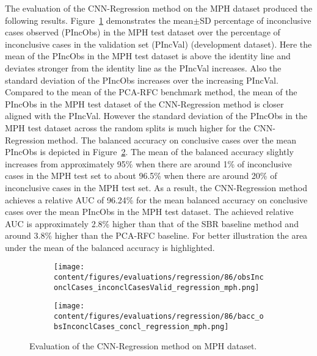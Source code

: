 

The evaluation of the CNN-Regression method on the MPH dataset produced the following results.
Figure~\ref{fig:obsInconclCases_inconclCasesValid_regression_mph} demonstrates
the mean$\pm$SD percentage of inconclusive cases observed (PIncObs) in the MPH test dataset 
over the percentage of inconclusive cases in the validation set (PIncVal) (development dataset).
Here the mean of the PIncObs in the MPH test dataset is above the identity line 
and deviates stronger from the identity line as the PIncVal increases.
Also the standard deviation of the PIncObs increases over the increasing PIncVal.
Compared to the mean of the PCA-RFC benchmark method, 
the mean of the PIncObs in the MPH test dataset of the CNN-Regression method is closer aligned with the PIncVal.
However the standard deviation of the PIncObs in the MPH test dataset across the random splits 
is much higher for the CNN-Regression method.
The balanced accuracy on conclusive cases over the mean PIncObs 
is depicted in Figure~\ref{fig:bacc_obsInconclCases_concl_regression_mph}.
The mean of the balanced accuracy slightly increases from approximately 95\% 
when there are around 1\% of inconclusive cases in the MPH test set to about 96.5\% 
when there are around 20\% of inconclusive cases in the MPH test set.
As a result, the CNN-Regression method achieves a relative AUC of 96.24\% for the mean balanced accuracy on conclusive cases 
over the mean PIncObs in the MPH test dataset.
The achieved relative AUC is approximately 2.8\% higher than that of the SBR baseline method 
and around 3.8\% higher than the PCA-RFC baseline.
For better illustration the area under the mean of the balanced accuracy is highlighted.


\begin{figure}[ht]
  \begin{subfigure}{0.9\textwidth}
    \centering
    \texttt{[image: content/figures/evaluations/regression/86/obsInconclCases\_inconclCasesValid\_regression\_mph.png]}
    \label{fig:obsInconclCases_inconclCasesValid_regression_mph}
  \end{subfigure}
  \hfill
  \begin{subfigure}{0.9\textwidth}
    \centering
    \texttt{[image: content/figures/evaluations/regression/86/bacc\_obsInconclCases\_concl\_regression\_mph.png]}
    \label{fig:bacc_obsInconclCases_concl_regression_mph}
  \end{subfigure}
  \caption{Evaluation of the CNN-Regression method on MPH dataset.}
  \label{fig:perf_regression_mph}
\end{figure}


